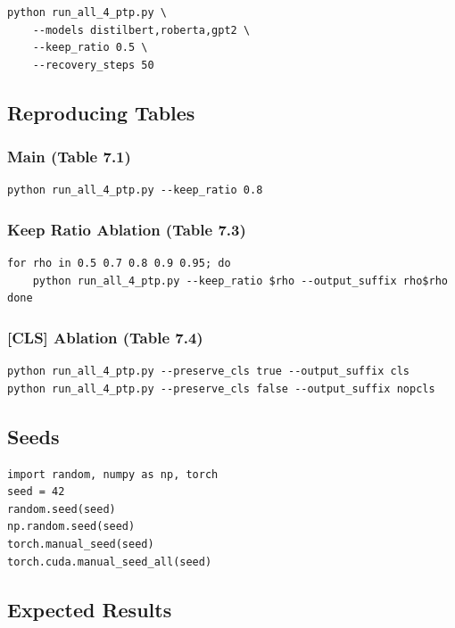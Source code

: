 {\begin{lstlisting}
python run_all_4_ptp.py \
    --models distilbert,roberta,gpt2 \
    --keep_ratio 0.5 \
    --recovery_steps 50
\end{lstlisting}

\subsection{Reproducing Tables}

\subsubsection{Main (Table 7.1)}
\begin{lstlisting}
python run_all_4_ptp.py --keep_ratio 0.8
\end{lstlisting}

\subsubsection{Keep Ratio Ablation (Table 7.3)}
\begin{lstlisting}
for rho in 0.5 0.7 0.8 0.9 0.95; do
    python run_all_4_ptp.py --keep_ratio $rho --output_suffix rho$rho
done
\end{lstlisting}

\subsubsection{[CLS] Ablation (Table 7.4)}
\begin{lstlisting}
python run_all_4_ptp.py --preserve_cls true --output_suffix cls
python run_all_4_ptp.py --preserve_cls false --output_suffix nopcls
\end{lstlisting}

\subsection{Seeds}

\begin{lstlisting}
import random, numpy as np, torch
seed = 42
random.seed(seed)
np.random.seed(seed)
torch.manual_seed(seed)
torch.cuda.manual_seed_all(seed)
\end{lstlisting}

\subsection{Expected Results}

}
